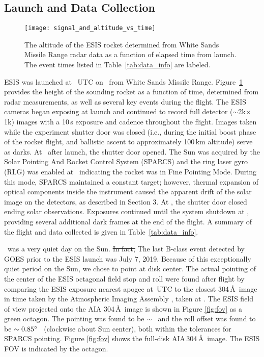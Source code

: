     
	\subsection{Launch and Data Collection} 
		\begin{figure}
			\begin{center}
				\texttt{[image: signal\_and\_altitude\_vs\_time]}
				\caption{The altitude of the ESIS rocket determined from White Sands Missile Range radar data as a function of elapsed time from launch.  The event times listed in Table~\ref{tab:data_info} are labeled.
				}
				\label{fig:timeline}
			\end{center}
		\end{figure}

		ESIS was launched at \timeMissionStart~UTC
		on \dateMission\ from White Sands Missile Range.  Figure~\ref{fig:timeline} provides the height of the sounding rocket as a function of time, determined from %
		radar measurements, as well as several key events during the flight.  
		The ESIS cameras began exposing at launch and continued to record full detector ($\sim$2k$\times$1k) images with a 10\,s exposure and cadence throughout the flight. Images taken while the
		experiment shutter door was closed (i.e., during the initial  boost phase of the rocket flight, and ballistic ascent to approximately 100\,km altitude) serve as darks.  
		At \timeMissionShutterOpen\ after launch, the shutter door %
		opened.  
		The Sun was acquired by the Solar Pointing And Rocket %
		Control System (SPARCS) and the ring laser gyro (RLG) was enabled at \timeMissionRlgEnable\ indicating the rocket was in Fine Pointing Mode.  
		During this mode, SPARCS maintained a constant target; however, thermal expansion of optical components inside the instrument caused the apparent drift of the solar image on the detectors, as described in Section 3.  
		At  \timeMissionShutterClose, the shutter door closed ending solar observations. Exposures continued until the system shutdown at \timeDataStop, providing several additional dark frames at the end of the flight.   A summary of the flight and data collected is given in Table~\ref{tab:data_info}.
		
	    \dateMission\ was a very quiet day on the Sun.  
	    \sout{In fact,} The last  B-class event detected by GOES \citep{GOES} prior to the ESIS launch was July 7, 2019.  Because of this exceptionally quiet period on the Sun, we chose to point at disk center. 
	    The actual pointing of the center of the ESIS octagonal field stop and roll were found after flight by comparing the ESIS exposure nearest apogee at \timeApogeeFrame\,UTC to the closest 304\,\AA \ image in time taken by the Atmospheric Imaging Assembly \citep[AIA][]{Lemen2012}, taken at \aianearapogee.  
	    The ESIS field of view projected onto the AIA 304\,\AA\ image is shown in Figure \ref{fig:fov} as a green octagon.  
	    The pointing was found to be $\sim$ \esispointing \ and the roll offset was found to be $\sim 0.85^{\circ}$ \ (clockwise about Sun center), both within the tolerances for SPARCS pointing.  
	    Figure \ref{fig:fov} shows the full-disk AIA\,304\,\AA\ image. 
	    The ESIS FOV is indicated by the octagon.  
	    
